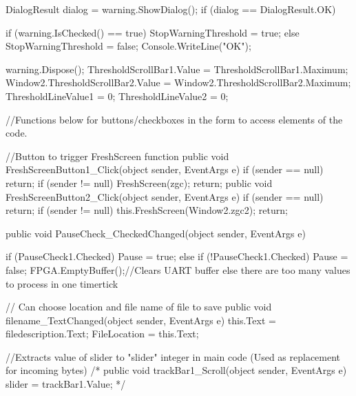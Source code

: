 {{{{                DialogResult dialog = warning.ShowDialog();
                if (dialog == DialogResult.OK)
                {
                    if (warning.IsChecked() == true)
                    {
                        StopWarningThreshold = true;
                    }
                    else
                    {
                        StopWarningThreshold = false;
                    }
                    Console.WriteLine("OK");
                    

                }
                warning.Dispose();
                ThresholdScrollBar1.Value = ThresholdScrollBar1.Maximum;
                Window2.ThresholdScrollBar2.Value = Window2.ThresholdScrollBar2.Maximum;
                ThresholdLineValue1 = 0;
                ThresholdLineValue2 = 0;
                
            }
        }

        //Functions below for buttons/checkboxes in the form to access elements of the code.

        //Button to trigger FreshScreen function
        public void FreshScreenButton1_Click(object sender, EventArgs e)
        {
            if (sender == null) return;
            if (sender != null)
            {
                FreshScreen(zgc);
            }
            return;
        }
        public void FreshScreenButton2_Click(object sender, EventArgs e)
        {
            if (sender == null) return;
            if (sender != null)
            {
                this.FreshScreen(Window2.zgc2);
            }
            return;
        }

        public void PauseCheck_CheckedChanged(object sender, EventArgs e)
        {
            if (PauseCheck1.Checked)
            {
                Pause = true;
            }
            else if (!PauseCheck1.Checked)
            {
                Pause = false;
                FPGA.EmptyBuffer();//Clears UART buffer else there are too many values to process in one timertick
            }

        }


        // Can choose location and file name of file to save
        public void filename_TextChanged(object sender, EventArgs e)
        {
            this.Text = filedescription.Text;
            FileLocation = this.Text;
        }


        //Extracts value of slider to "slider" integer in main code (Used as replacement for incoming bytes)
        /* public void trackBar1_Scroll(object sender, EventArgs e)
         {
             slider = trackBar1.Value;
         }*/


}}
